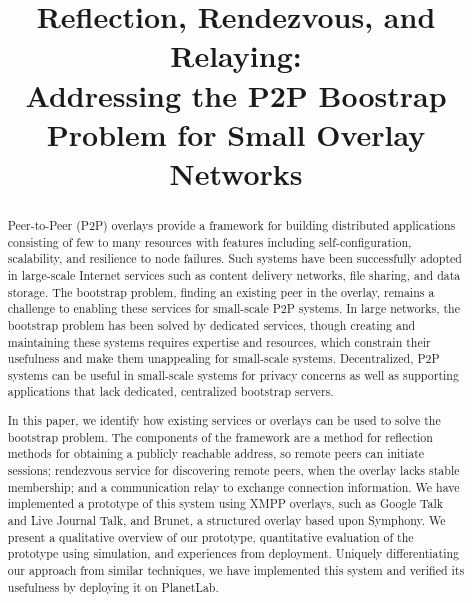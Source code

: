 \documentclass[conference]{IEEEtran}
\begin{document}
\title{Reflection, Rendezvous, and Relaying: \\
Addressing the P2P Boostrap Problem for Small Overlay Networks}

\author{
}

\maketitle

\begin{abstract}

Peer-to-Peer (P2P) overlays provide a framework for building distributed
applications consisting of few to many resources with features including
self-configuration, scalability, and resilience to node failures.  Such systems
have been successfully adopted in large-scale Internet services such as content
delivery networks, file sharing, and data storage.  The bootstrap problem,
finding an existing peer in the overlay, remains a challenge to enabling these
services for small-scale P2P systems.  In large networks, the bootstrap problem
has been solved by dedicated services, though creating and maintaining these
systems requires expertise and resources, which constrain their usefulness and
make them unappealing for small-scale systems.  Decentralized, P2P systems can
be useful in small-scale systems for privacy concerns as well as supporting
applications that lack dedicated, centralized bootstrap servers.

In this paper, we identify how existing services or overlays can be used to
solve the bootstrap problem.  The components of the framework are a method for
reflection methods for obtaining a publicly reachable address, so remote peers
can initiate sessions; rendezvous service for discovering remote peers, when
the overlay lacks stable membership; and a communication relay to exchange
connection information.  We have implemented a prototype of this system using
XMPP overlays, such as Google Talk and Live Journal Talk, and Brunet, a
structured overlay based upon Symphony.  We present a qualitative overview of
our prototype, quantitative evaluation of the prototype using simulation, and
experiences from deployment.  Uniquely differentiating our approach from
similar techniques, we have implemented this system and verified its usefulness
by deploying it on PlanetLab.

\end{abstract}
\end{document}
